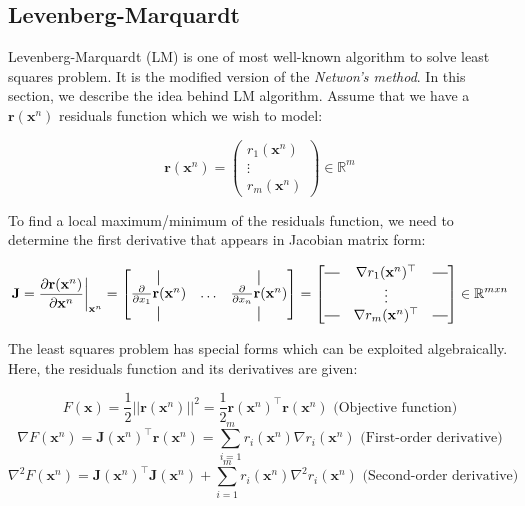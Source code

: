 \documentclass[12pt]{report}
\numberwithin{figure}{section}
\newcommand{\R}{\mathbb{R}}
\newcommand*{\vertbar}{\rule[-1ex]{0.5pt}{2.5ex}}
\newcommand*{\horzbar}{\rule[.5ex]{2.5ex}{0.5pt}}
\begin{document}
\begin{appendices}
\subsection{Levenberg-Marquardt}
Levenberg-Marquardt (LM) is one of most well-known algorithm 
to solve least squares problem. It is the modified version of the \textit{Netwon's method}. 
In this section, we describe the idea behind 
LM algorithm. Assume that we have a $\mathbf{r}(\mathbf{x}^n)$ residuals 
function which we 
wish to model:

\begin{equation}
  \mathbf{r}(\mathbf{x}^n) = \begin{pmatrix} r_1(\mathbf{x}^n) \\ \vdots \\ r_m(\mathbf{x}^n) \end{pmatrix} \in \R^m
\end{equation}

To find a local maximum/minimum of the residuals function, we need to 
determine the first derivative that 
appears in Jacobian matrix form:

\begin{equation}
  \mathbf{J} = \frac{\partial \mathbf{r}(\mathbf{x}^n)}{\partial \mathbf{x}^n } \bigg|_{\mathbf{x}^n}
  = 
  \begin{bmatrix} 
    \vertbar & & \vertbar \\
    \frac{\partial}{\partial x_1}\mathbf{r}(\mathbf{x}^n) & \dots & \frac{\partial}{\partial x_n}\mathbf{r}(\mathbf{x}^n) \\
    \vertbar & & \vertbar
  \end{bmatrix}
  = 
  \begin{bmatrix}
    \horzbar & \nabla r_1(\mathbf{x}^n)^\top & \horzbar \\
     & \vdots & \\
     \horzbar & \nabla r_m(\mathbf{x}^n)^\top & \horzbar 
  \end{bmatrix}
  \in \R^{mxn}
\end{equation}

The least squares problem has special forms which can be exploited 
algebraically.
Here, the residuals function and its derivatives are given:

\begin{equation}
  F(\mathbf{x}) = \frac{1}{2} ||\mathbf{r}(\mathbf{x}^n)||^2 = \frac{1}{2} 
  \mathbf{r}(\mathbf{x}^n)^\top \mathbf{r}(\mathbf{x}^n) \text{  
  (Objective 
  function)}
\end{equation}\label{eq:residuals_objective}
\begin{equation}
\nabla F(\mathbf{x}^n) = \mathbf{J}(\mathbf{x}^n)^\top 
\mathbf{r}(\mathbf{x}^n) = 
\sum_{i=1}^{m} r_i(\mathbf{x}^n) \nabla r_i(\mathbf{x}^n) \text{  (First-order 
derivative)}
\end{equation}\label{eq:residuals_objective_first_der}
\begin{equation}
  \nabla^2 F(\mathbf{x}^n) = 
  \mathbf{J}(\mathbf{x}^n)^\top\mathbf{J}(\mathbf{x}^n) + \sum_{i=1}^m 
  r_i(\mathbf{x}^n) \nabla^2 r_i(\mathbf{x}^n) \text{ (Second-order 
  derivative)}
\end{equation}\label{eq:residuals_objective_second_der}



\end{appendices}
\end{document}
